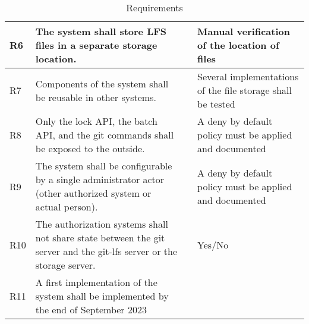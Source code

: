 \begin{table}[h]
\begin{tabular}{|p{}|p{}|p{}|p{}|}
        R6  & The system shall store LFS files in a separate storage location.                                                     &                                                                                                          & Manual verification of the location of files                \\ \hline
        R7  & Components of the system shall be reusable in other systems.                                                         &                                                                                                          & Several implementations of the file storage shall be tested \\ \hline
        R8  & Only the lock API, the batch API, and the git commands shall be exposed to the outside.                              &                                                                                                          & A deny by default policy must be applied and documented     \\ \hline
        R9  & The system shall be configurable by a single administrator actor (other authorized system or actual person).         &                                                                                                          & A deny by default policy must be applied and documented     \\ \hline
        R10 & The authorization systems shall not share state between the git server and the git-lfs server or the storage server. &                                                                                                          & Yes/No                                                      \\ \hline
        R11 & A first implementation of the system shall be implemented by the end of September 2023                               &                                                                                                          &                                                             \\ \hline
    \end{tabular}
    \caption{Requirements}
    \label{tab:requirements}
\end{table}

